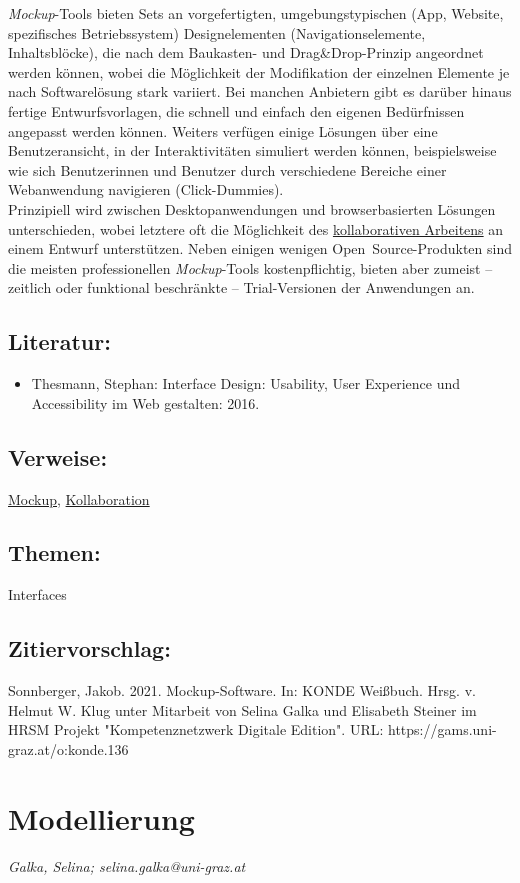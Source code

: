 \documentclass{article}
\begin{document}
        \emph{Mockup}-Tools bieten Sets an vorgefertigten, umgebungstypischen (App, Website, spezifisches Betriebssystem) Designelementen (Navigationselemente, Inhaltsblöcke), die nach dem Baukasten- und Drag\&Drop-Prinzip angeordnet werden können, wobei die Möglichkeit der Modifikation der einzelnen Elemente je nach Softwarelösung stark variiert. Bei manchen Anbietern gibt es darüber hinaus fertige Entwurfsvorlagen, die schnell und einfach den eigenen Bedürfnissen angepasst werden können. Weiters verfügen einige Lösungen über eine Benutzeransicht, in der Interaktivitäten simuliert werden können, beispielsweise wie sich Benutzerinnen und Benutzer durch verschiedene Bereiche einer Webanwendung navigieren (Click-Dummies).\\
            
        Prinzipiell wird zwischen Desktopanwendungen und browserbasierten Lösungen unterschieden, wobei letztere oft die Möglichkeit des \href{http://gams.uni-graz.at/o:konde.104}{kollaborativen Arbeitens} an einem Entwurf unterstützen. Neben einigen wenigen Open Source-Produkten sind die meisten professionellen \emph{Mockup}-Tools kostenpflichtig, bieten aber zumeist – zeitlich oder funktional beschränkte – Trial-Versionen der Anwendungen an. \\
            
        \subsection*{Literatur:}\begin{itemize}\item Thesmann, Stephan: Interface Design: Usability, User Experience und Accessibility im Web gestalten: 2016.\end{itemize}\subsection*{Verweise:}\href{https://gams.uni-graz.at/o:konde.135}{Mockup}, \href{https://gams.uni-graz.at/o:konde.104}{Kollaboration}\subsection*{Themen:}Interfaces\subsection*{Zitiervorschlag:}Sonnberger, Jakob. 2021. Mockup-Software. In: KONDE Weißbuch. Hrsg. v. Helmut W. Klug unter Mitarbeit von Selina Galka und Elisabeth Steiner im HRSM Projekt "Kompetenznetzwerk Digitale Edition". URL: https://gams.uni-graz.at/o:konde.136\newpage\section*{Modellierung} \emph{Galka, Selina; selina.galka@uni-graz.at }\\
        
\end{document}
